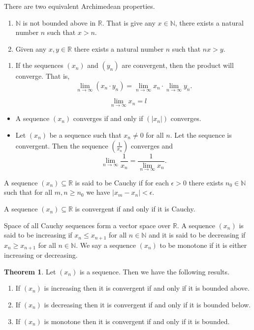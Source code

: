 \documentclass{article}
\theoremstyle{definition}
\newtheorem{theorem}{Theorem}
\begin{document}
    There are two equivalent Archimedean properties. 
    \begin{enumerate}
        \item $\mathbb{N} $ is not bounded above in $\mathbb{R} $. That is give any $x\in \mathbb{N} $, there exists a natural number $n$ such that $x>n$.
        \item Given any $x,y\in \mathbb{R} $ there exists a natural number $n$ such  that $nx>y$. 
    \end{enumerate}
    
    \begin{enumerate}
        \item If the sequences $\left( x_n \right) $ and $\left( y_n \right) $ are convergent, then the product will converge. That is,
        \[
            \lim_{n \to \infty} \left( x_n\cdot y_n \right) = \lim_{n \to \infty} x_n \cdot \lim_{n \to \infty} y_n.
        \]
    \end{enumerate}

    \[
        \lim_{n \to \infty} x_n = l
    \]

    \begin{itemize}
        \item A sequence $\left( x_n \right) $ converges if and only if $\left( \left\vert x_n \right\vert  \right) $ converges.
        \item Let $\left( x_n \right) $ be a sequence such that $x_n\neq 0$ for all $n$. Let the sequence is convergent. Then the sequence $\left( \frac{1}{x_n} \right) $ converges and 
        \[
            \lim_{n \to \infty} \frac{1}{x_n} = \frac{1}{\lim_{n \to \infty} x_n}.
        \]
    \end{itemize}
    
    A sequence $\left( x_n \right) \subseteq \mathbb{R} $ is said to be Cauchy if for each $\epsilon >0$ there exists $n_0\in \mathbb{N} $ such that for all $m,n\ge n_0$ we have $\left\vert x_m-x_n \right\vert < \epsilon $. 

    A sequence $\left( x_n \right) \subseteq \mathbb{R} $ is convergent if and only if it is Cauchy.

    Space of all Cauchy sequences form a vector space over $\mathbb{R} $.
    A sequence $\left( x_n \right) $ is said to be increasing if $x_n \leq  x_{n+1}$ for all $n\in \mathbb{N} $ and it is said to be decreasing if $x_n \ge x_{n+1}$ for all $n\in \mathbb{N} $. We say a sequence $\left( x_n \right) $ to be monotone if it is either increasing or decreasing. 
    \begin{theorem}
        Let $\left( x_n \right) $ is a sequence. Then we have the following results.
        \begin{enumerate}
            \item If $\left( x_n \right) $ is increasing then it is convergent if and only if it is bounded above.
            \item If $\left( x_n \right) $ is decreasing then it is convergent if and only if it is bounded below.
            \item If $\left( x_n \right) $ is monotone then it is convergent if and only if it is bounded.
        \end{enumerate}
    \end{theorem}
\end{document}
